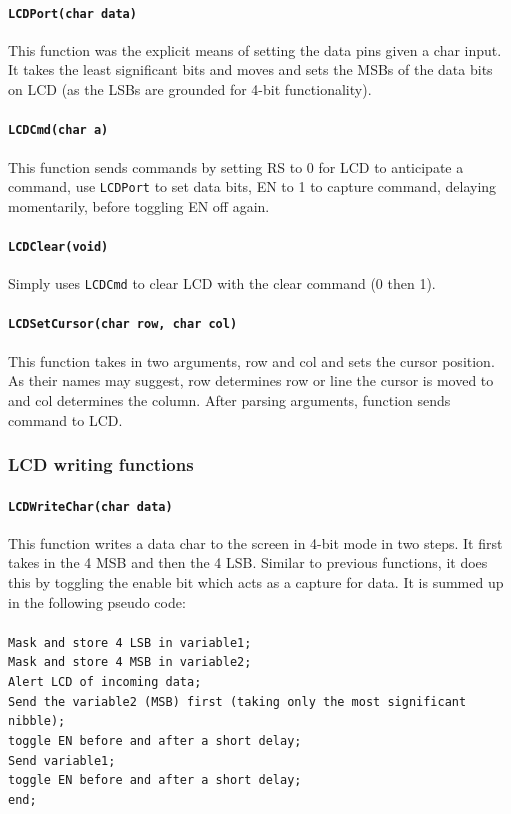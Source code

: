 \documentclass{article}
\begin{document}
\paragraph{\texttt{LCD\textunderscore Port(char data)}} This function was the explicit means of setting the data pins given a char input. It takes the least significant bits and moves and sets the MSBs of the data bits on LCD (as the LSBs are grounded for 4-bit functionality).
\paragraph{\texttt{LCD\textunderscore Cmd(char a)}} This function sends commands by setting RS to 0 for LCD to anticipate a command, use \texttt{LCD\textunderscore Port} to set data bits, EN to 1 to capture command, delaying momentarily, before toggling EN off again.
\paragraph{\texttt{LCD\textunderscore Clear(void)}}
Simply uses \texttt{LCD\textunderscore Cmd} to clear LCD with the clear command (0 then 1).
\paragraph{\texttt{LCD\textunderscore Set\textunderscore Cursor(char row, char col)}} This function takes in two arguments, row and col and sets the cursor position. As their names may suggest, row determines row or line the cursor is moved to and col determines the column. After parsing arguments, function sends command to LCD.

\subsubsection{LCD writing functions}
\paragraph{\texttt{LCD\textunderscore Write\textunderscore Char(char data)}} This function writes a data char to the screen in 4-bit mode in two steps. It first takes in the 4 MSB and then the 4 LSB. Similar to previous functions, it does this by toggling the enable bit which acts as a capture for data. It is summed up in the following pseudo code: \\\\
\texttt{Mask and store 4 LSB in variable1;\\Mask and store 4 MSB in variable2;\\Alert LCD of incoming data;\\Send the variable2 (MSB) first (taking only the most significant nibble);\\toggle EN before and after a short delay;\\ Send variable1;\\toggle EN before and after a short delay;\\end;}
\end{document}
